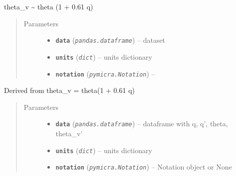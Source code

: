 \documentclass[a4paper,10pt,oneside]{sphinxmanual}
\begin{document}
\begin{fulllineitems}
\label{pymicra:pymicra.physics.theta_from_theta_v}
theta\_v \textasciitilde{} theta (1 + 0.61 q)
\begin{quote}\begin{description}
\item[{Parameters}] \leavevmode\begin{itemize}
\item {} 
\textbf{\texttt{data}} (\emph{\texttt{pandas.dataframe}}) -- dataset

\item {} 
\textbf{\texttt{units}} (\emph{\texttt{dict}}) -- units dictionary

\item {} 
\textbf{\texttt{notation}} (\emph{\texttt{pymicra.Notation}}) -- 

\end{itemize}

\end{description}\end{quote}

\end{fulllineitems}


\begin{fulllineitems}
\label{pymicra:pymicra.physics.theta_std_from_theta_v_fluc}
Derived from theta\_v = theta(1 + 0.61 q)
\begin{quote}\begin{description}
\item[{Parameters}] \leavevmode\begin{itemize}
\item {} 
\textbf{\texttt{data}} (\emph{\texttt{pandas.dataframe}}) -- dataframe with q, q', theta, theta\_v'

\item {} 
\textbf{\texttt{units}} (\emph{\texttt{dict}}) -- units dictionary

\item {} 
\textbf{\texttt{notation}} (\emph{\texttt{pymicra.Notation}}) -- Notation object or None

\end{itemize}

\end{description}\end{quote}

\end{fulllineitems}
\end{document}
